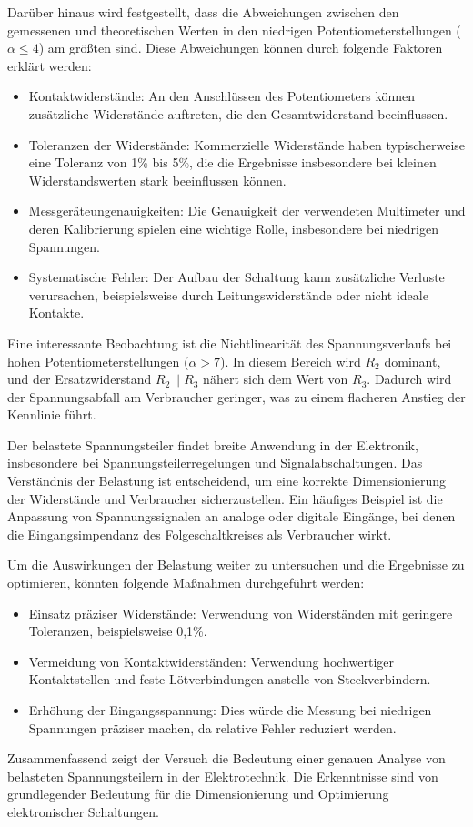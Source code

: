 Darüber hinaus wird festgestellt, dass die Abweichungen zwischen den gemessenen und theoretischen Werten in den niedrigen Potentiometerstellungen (\(\alpha \leq 4\)) am größten sind. Diese Abweichungen können durch folgende Faktoren erklärt werden:
\begin{itemize}
    \item Kontaktwiderstände: An den Anschlüssen des Potentiometers können zusätzliche Widerstände auftreten, die den Gesamtwiderstand beeinflussen.
    \item Toleranzen der Widerstände: Kommerzielle Widerstände haben typischerweise eine Toleranz von 1\% bis 5\%, die die Ergebnisse insbesondere bei kleinen Widerstandswerten stark beeinflussen können.
    \item Messgeräteungenauigkeiten: Die Genauigkeit der verwendeten Multimeter und deren Kalibrierung spielen eine wichtige Rolle, insbesondere bei niedrigen Spannungen.
    \item Systematische Fehler: Der Aufbau der Schaltung kann zusätzliche Verluste verursachen, beispielsweise durch Leitungswiderstände oder nicht ideale Kontakte.
\end{itemize}

Eine interessante Beobachtung ist die Nichtlinearität des Spannungsverlaufs bei hohen Potentiometerstellungen (\(\alpha > 7\)). In diesem Bereich wird $R_2$ dominant, und der Ersatzwiderstand $R_2 \parallel R_3$ nähert sich dem Wert von $R_3$. Dadurch wird der Spannungsabfall am Verbraucher geringer, was zu einem flacheren Anstieg der Kennlinie führt.

Der belastete Spannungsteiler findet breite Anwendung in der Elektronik, insbesondere bei Spannungsteilerregelungen und Signalabschaltungen. Das Verständnis der Belastung ist entscheidend, um eine korrekte Dimensionierung der Widerstände und Verbraucher sicherzustellen. Ein häufiges Beispiel ist die Anpassung von Spannungssignalen an analoge oder digitale Eingänge, bei denen die Eingangsimpendanz des Folgeschaltkreises als Verbraucher wirkt.

Um die Auswirkungen der Belastung weiter zu untersuchen und die Ergebnisse zu optimieren, könnten folgende Maßnahmen durchgeführt werden:
\begin{itemize}
    \item Einsatz präziser Widerstände: Verwendung von Widerständen mit geringere Toleranzen, beispielsweise 0,1\%.
    \item Vermeidung von Kontaktwiderständen: Verwendung hochwertiger Kontaktstellen und feste Lötverbindungen anstelle von Steckverbindern.
    \item Erhöhung der Eingangsspannung: Dies würde die Messung bei niedrigen Spannungen präziser machen, da relative Fehler reduziert werden.
\end{itemize}

Zusammenfassend zeigt der Versuch die Bedeutung einer genauen Analyse von belasteten Spannungsteilern in der Elektrotechnik. Die Erkenntnisse sind von grundlegender Bedeutung für die Dimensionierung und Optimierung elektronischer Schaltungen.


\newpage
